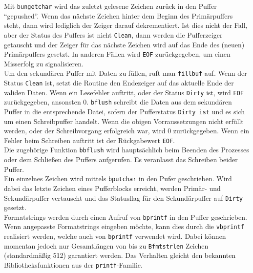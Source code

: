 Mit \texttt{bungetchar} wird das zuletzt gelesene Zeichen zurück in den Puffer ``gepushed''.
Wenn das nächste Zeichen hinter dem Beginn des Primärpuffers steht,
dann wird lediglich der Zeiger darauf dekrementiert.
Ist dies nicht der Fall, aber der Status des Puffers ist nicht \texttt{Clean},
dann werden die Pufferzeiger getauscht und der Zeiger für das nächste Zeichen wird auf das Ende des (neuen) Primärpuffers gesetzt.
In anderen Fällen wird \texttt{EOF} zurückgegeben,
um einen Misserfolg zu signalisieren. \\
Um den sekundären Puffer mit Daten zu füllen,
ruft man \texttt{fillbuf} auf.
Wenn der Status \texttt{Clean} ist,
setzt die Routine den Endezeiger auf das aktuelle Ende der validen Daten.
Wenn ein Lesefehler auftritt,
oder der Status \texttt{Dirty} ist,
wird \texttt{EOF} zurückgegeben,
ansonsten 0.
\texttt{bflush} schreibt die Daten aus dem sekundären Puffer in die entsprechende Datei,
sofern der Pufferstatus \texttt{Dirty ist} und es sich um einen Schreibpuffer handelt.
Wenn die obigen Vorraussetzungen nicht erfüllt werden,
oder der Schreibvorgang erfolgreich war,
wird 0 zurückgegeben.
Wenn ein Fehler beim Schreiben auftritt ist der Rückgabewert \texttt{EOF}. \\
Die zugehörige Funktion \texttt{bbflush} wird hauptsächlich beim Beenden des Prozesses oder dem Schließen des Puffers aufgerufen.
Es veranlasst das Schreiben beider Puffer. \\
Ein einzelnes Zeichen wird mittels \texttt{bputchar} in den Pufer geschrieben.
Wird dabei das letzte Zeichen eines Pufferblocks erreicht,
werden Primär- und Sekundärpuffer vertauscht
und das Statusflag für den Sekundärpuffer auf \texttt{Dirty} gesetzt. \\
Formatstrings werden durch einen Aufruf von \texttt{bprintf} in den Puffer geschrieben.
Wenn angepasste Formatstrings eingeben möchte,
kann dies durch die \texttt{vbprintf} realisiert werden,
welche auch von \texttt{bprintf} verwendet wird.
Dabei können momentan jedoch nur Gesamtlängen von bis zu \texttt{Bfmtstrlen} Zeichen (standardmäßig 512) garantiert werden.
Das Verhalten gleicht den bekannten Bibliotheksfunktionen aus der \texttt{printf}-Familie.
